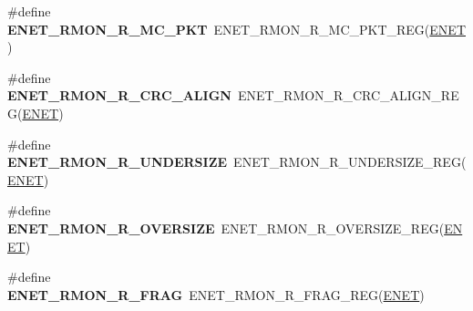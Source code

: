 \begin{DoxyCompactItemize}
\item 
\#define {\bfseries E\+N\+E\+T\+\_\+\+R\+M\+O\+N\+\_\+\+R\+\_\+\+M\+C\+\_\+\+P\+KT}~E\+N\+E\+T\+\_\+\+R\+M\+O\+N\+\_\+\+R\+\_\+\+M\+C\+\_\+\+P\+K\+T\+\_\+\+R\+EG(\hyperlink{group__ENET__Peripheral__Access__Layer_ga4745105f505f3ab949d6a57fbe2a0ed5}{E\+N\+ET})\hypertarget{group__ENET__Register__Accessor__Macros_ga7c12300a354d5e4d7fcdba27b63f0258}{}\label{group__ENET__Register__Accessor__Macros_ga7c12300a354d5e4d7fcdba27b63f0258}

\item 
\#define {\bfseries E\+N\+E\+T\+\_\+\+R\+M\+O\+N\+\_\+\+R\+\_\+\+C\+R\+C\+\_\+\+A\+L\+I\+GN}~E\+N\+E\+T\+\_\+\+R\+M\+O\+N\+\_\+\+R\+\_\+\+C\+R\+C\+\_\+\+A\+L\+I\+G\+N\+\_\+\+R\+EG(\hyperlink{group__ENET__Peripheral__Access__Layer_ga4745105f505f3ab949d6a57fbe2a0ed5}{E\+N\+ET})\hypertarget{group__ENET__Register__Accessor__Macros_ga25e7f9008cb3109fa60252ee05422a39}{}\label{group__ENET__Register__Accessor__Macros_ga25e7f9008cb3109fa60252ee05422a39}

\item 
\#define {\bfseries E\+N\+E\+T\+\_\+\+R\+M\+O\+N\+\_\+\+R\+\_\+\+U\+N\+D\+E\+R\+S\+I\+ZE}~E\+N\+E\+T\+\_\+\+R\+M\+O\+N\+\_\+\+R\+\_\+\+U\+N\+D\+E\+R\+S\+I\+Z\+E\+\_\+\+R\+EG(\hyperlink{group__ENET__Peripheral__Access__Layer_ga4745105f505f3ab949d6a57fbe2a0ed5}{E\+N\+ET})\hypertarget{group__ENET__Register__Accessor__Macros_gac02167e9de47c2ce9a0dfb51f0b24fa1}{}\label{group__ENET__Register__Accessor__Macros_gac02167e9de47c2ce9a0dfb51f0b24fa1}

\item 
\#define {\bfseries E\+N\+E\+T\+\_\+\+R\+M\+O\+N\+\_\+\+R\+\_\+\+O\+V\+E\+R\+S\+I\+ZE}~E\+N\+E\+T\+\_\+\+R\+M\+O\+N\+\_\+\+R\+\_\+\+O\+V\+E\+R\+S\+I\+Z\+E\+\_\+\+R\+EG(\hyperlink{group__ENET__Peripheral__Access__Layer_ga4745105f505f3ab949d6a57fbe2a0ed5}{E\+N\+ET})\hypertarget{group__ENET__Register__Accessor__Macros_ga0b81baf39415b445c3454ff4edd8ec4d}{}\label{group__ENET__Register__Accessor__Macros_ga0b81baf39415b445c3454ff4edd8ec4d}

\item 
\#define {\bfseries E\+N\+E\+T\+\_\+\+R\+M\+O\+N\+\_\+\+R\+\_\+\+F\+R\+AG}~E\+N\+E\+T\+\_\+\+R\+M\+O\+N\+\_\+\+R\+\_\+\+F\+R\+A\+G\+\_\+\+R\+EG(\hyperlink{group__ENET__Peripheral__Access__Layer_ga4745105f505f3ab949d6a57fbe2a0ed5}{E\+N\+ET})\hypertarget{group__ENET__Register__Accessor__Macros_gad0856e86288f36006ca6d4adc2a2547a}{}\label{group__ENET__Register__Accessor__Macros_gad0856e86288f36006ca6d4adc2a2547a}


\end{DoxyCompactItemize}
